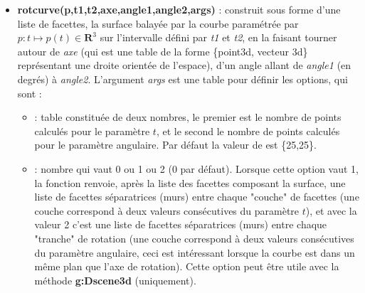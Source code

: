 \begin{itemize}
\begin{demo}{Exemple avec line2tube}
\begin{luadraw}{name=line2tube}
local cos, sin, pi, i = math.cos, math.sin, math.pi, cpx.I
local g = graph3d:new{window={-5,8,-4.5,4.5}, viewdir={45,60}, margin={0,0,0,0}, size={10,10}}
g:Linejoin("round")
local L1 = map(toPoint3d,polyreg(0,3,6)) -- hexagone régulier dans le plan xOy, centre O de sommet M(3,0,0)
local L2 = shift3d(rotate3d(L1,90,{Origin,vecJ}),3*vecJ)
local T1 = line2tube(L1,1,{nbfacet=8,close=true}) -- tube 1 refermé
local T2 = line2tube(L2,1,{nbfacet=8})  -- tube 2 non refermé
g:Dmixfacet( T1, {color="Crimson",opacity=0.8}, T2, {color="SteelBlue"} )
g:Show()
\end{luadraw}
\end{demo}

    \item \textbf{rotcurve(p,t1,t2,axe,angle1,angle2,args)} : construit sous forme d'une liste de facettes, la surface balayée par la courbe paramétrée par $p\colon t\mapsto p(t)\in \mathbf R^3$ sur l'intervalle défini par \emph{t1} et \emph{t2}, en la faisant tourner autour de \emph{axe} (qui est une table de la forme \{point3d, vecteur 3d\} représentant une droite orientée de l'espace), d'un angle allant de \emph{angle1} (en degrés) à \emph{angle2}. L'argument \emph{args} est une table pour définir les options, qui sont :
    \begin{itemize}
        \item {} : table constituée de deux nombres, le premier est le nombre de points calculés pour le paramètre $t$, et le second le nombre de points calculés pour le paramètre angulaire. Par défaut la valeur de  est \{25,25\}.

        \item {} : nombre qui vaut 0 ou 1 ou 2 (0 par défaut). Lorsque cette option vaut 1, la fonction renvoie, après la liste des facettes composant la surface, une liste de facettes séparatrices (murs) entre chaque "couche" de facettes (une couche correspond à deux valeurs consécutives du paramètre $t$), et avec la valeur 2 c'est une liste de facettes séparatrices (murs) entre chaque "tranche" de rotation (une couche correspond à deux valeurs consécutives du paramètre angulaire, ceci est intéressant lorsque la courbe est dans un même plan que l'axe de rotation). Cette option peut être utile avec la méthode \textbf{g:Dscene3d} (uniquement).
        \end{itemize} 
        

\end{itemize}
